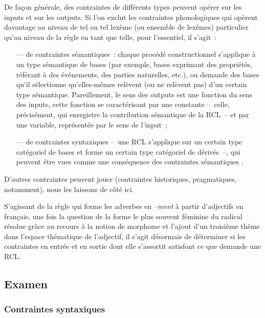\documentclass[output=paper]{langsci/langscibook}
\begin{document}
De façon générale, des contraintes de différents types peuvent opérer sur les inputs et sur les outputs. Si l'on exclut les contraintes phonologiques qui opèrent davantage au niveau de tel ou tel lexème (ou ensemble de lexèmes) particulier qu'au niveau de la règle en tant que telle, pour l'essentiel, il s'agit~:

\largerpage
\begin{itemize}
\item[---] de contraintes sémantiques~: chaque procédé constructionnel s'applique à un type sémantique de bases (par exemple, bases exprimant des propriétés, référant à des événements, des parties naturelles, etc.), ou demande des bases qu'il sélectionne qu'elles-mêmes relèvent (ou ne relèvent pas) d'un certain type sémantique. Pareillement, le sens des outputs est une fonction du sens des inputs, cette fonction se caractérisant par une constante --~celle, précisément, qui enregistre la contribution sémantique de la RCL~-- et par une variable, représentée par le sens de l'input~;

\item[---] de contraintes syntaxiques --~une RCL s'applique sur un certain type catégoriel de bases et forme un certain type catégoriel de dérivés~--, qui peuvent être vues comme une conséquence des contraintes sémantiques %
\citep[cf., notamment,][]{Dal04}%
%
.
\end{itemize}
D'autres contraintes peuvent jouer (contraintes historiques, pragmatiques, notamment), nous les laissons de côté ici.

S'agissant de la règle qui forme les adverbes en \emph{--ment} à partir d'adjectifs en français, une fois la question de la forme le plus souvent féminine du radical résolue grâce au recours à la notion de morphome et l'ajout d'un troisième thème dans l'espace thématique  de l'adjectif, il s'agit désormais de déterminer si les contraintes en entrée et en sortie dont elle s'assortit satisfont ce que demande une RCL.

\subsection{Examen}\label{section:dal:3.3}
\largerpage
\subsubsection{Contraintes syntaxiques}\label{section:dal:3.3.1}
\end{document}
